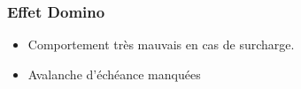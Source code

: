 \documentclass[ignorenonframetext,]{beamer}
\begin{document}
\begin{frame}\frametitle{Effet Domino}

\begin{itemize}
\item
  Comportement très mauvais en cas de surcharge.
\item
  Avalanche d'échéance manquées
\end{itemize}

\begin{center}

\begin{RTGrid}[width=10cm]{4}{24}











\end{RTGrid}

\end{center}

\end{frame}
\end{document}
